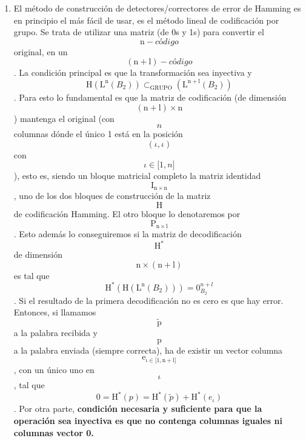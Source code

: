 \begin{enumerate}
\begin{enumerate}
\begin{enumerate}
\begin{enumerate}
        Luego la corrección será
        \[\mathtt{\mathrm{\widetilde{p}}}\rightarrow\mathtt{\mathrm{p^{i}}}\]necesariamente.
        Siempre habrá una sola pala\-bra de nuestro código que esté a
        distancia menor o igual que \[p\], estando las de\-más palabras
        del código a distancia mayor o igual que \[p + 1\].
      \item
        El método de construcción de detectores/correctores de error de
        Hamming es en principio el más fácil de usar, es el método
        lineal de codificación por grupo. Se trata de utilizar una
        matriz (de 0s y 1s) para convertir el
        \[\mathtt{\mathrm{n}} - \mathit{código}\] original, en
        un\[\left( \mathtt{\mathrm{n + l}} \right) - \mathit{código}\].
        La condición principal es que la transformación sea inyecti\-va
        y\[\mathtt{\mathrm{H}}\left( {\mathtt{\mathrm{L}}^{\mathtt{\mathrm{n}}}\left( B_{2} \right)} \right) \subset_{\text{GRUPO}}\left( {\mathtt{\mathrm{L}}^{\mathtt{\mathrm{n + l}}}\left( B_{2} \right)} \right)\].
        Para esto lo fundamental es que la matriz de codificación (de
        dimensión
        \[\left( \mathtt{\mathrm{n + l}} \right) \times \mathtt{\mathrm{n}}\])
        mantenga el original (con \[n\] colum\-nas dónde el único 1 está
        en la posición
        \[\left( {\iota,\iota} \right)\]con\[\iota \in {\lbrack{1,n}\rbrack}\]),
        esto es, siendo un bloque matricial completo la matriz
        identidad\[\mathtt{\mathrm{I_{n \times n}}}\], uno de los dos
        bloques de construcción de la matriz\[\mathtt{\mathrm{H}}\]de
        codificación Hamming. El otro bloque lo de\-notaremos por
        \[\mathtt{\mathrm{P_{n \times l}}}\]. Esto además lo
        conseguiremos si la matriz de decodifica\-ción
        \[\mathtt{\mathrm{H}}^{\mathbf{\mathrm{\ast}}}\]de dimensión
        \[\mathtt{\mathrm{n \times \left( {n + l} \right)}}\]es tal que
        \[\mathtt{\mathrm{H^{\mathbf{\mathrm{\ast}}}}}{\left( {\mathtt{\mathrm{H}}\left( {\mathtt{\mathrm{L}}^{\mathtt{\mathrm{n}}}\left( B_{2} \right)} \right)} \right) = 0_{B_{2}}^{n + l}}\].
        Si el resultado de la primera decodificación no es cero es que
        hay error. Entonces, si llamamos
        \[\widetilde{\mathtt{\mathrm{p}}}\]a la palabra recibida y
        \[\mathtt{\mathrm{p}}\]a la palabra enviada (siempre correcta),
        ha de existir un vector columna
        \[\mathtt{\mathrm{e_{\iota \in {\lbrack{1,{n + l}}\rbrack}}}}\],
        con un único uno en \[\iota\], tal que
        \[{0 = \mathtt{\mathrm{H^{\mathbf{\mathrm{\text{*}}}}}}}{(p) = \mathtt{\mathrm{H^{\mathbf{\mathrm{\text{*}}}}}}}{\left( \widetilde{p} \right) + {\mathtt{\mathrm{H^{\mathbf{\mathrm{\text{*}}}}}}\left( e_{\iota} \right)}}\].
        Por otra parte, \textbf{condición necesaria y sufi\-ciente para
        que la operación sea inyectiva es que no contenga columnas
        igua\-les ni columnas vector 0.}


\end{enumerate}
\end{enumerate}
\end{enumerate}
\end{enumerate}
